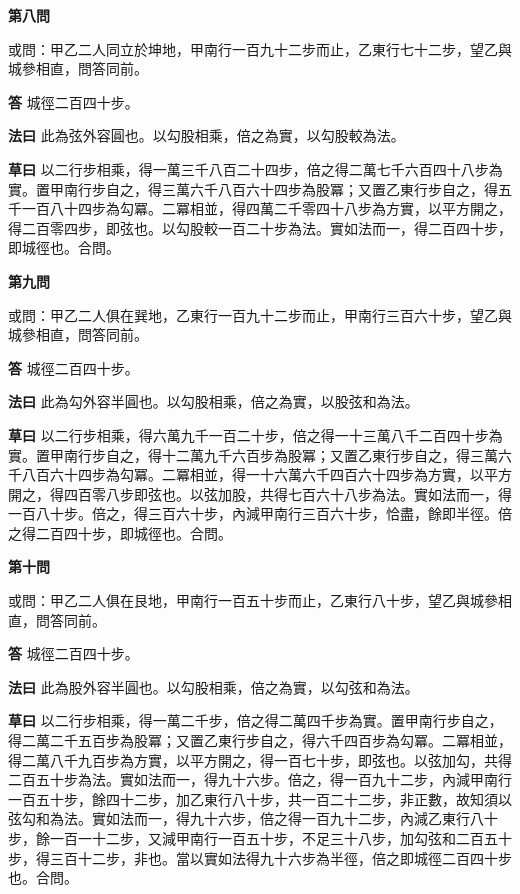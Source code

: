 \documentclass[11pt,a4paper]{article}
\newcommand{\problem}[1]{\par\noindent\textbf{\color{problemcolor}#1}\par\nopagebreak}
\newcommand{\answer}[1]{\par\noindent\textbf{答} #1\par}
\newcommand{\method}[1]{\par\noindent\textbf{法曰} #1\par}
\newcommand{\workings}[1]{\par\noindent\textbf{草曰} #1\par}
\begin{document}
\vspace{0.5cm}

\problem{第八問}

\noindent 或問：甲乙二人同立於坤地，甲南行一百九十二步而止，乙東行七十二步，望乙與城參相直，問答同前。

\answer{城徑二百四十步。}

\method{此為弦外容圓也。以勾股相乘，倍之為實，以勾股較為法。}

\workings{以二行步相乘，得一萬三千八百二十四步，倍之得二萬七千六百四十八步為實。置甲南行步自之，得三萬六千八百六十四步為股冪；又置乙東行步自之，得五千一百八十四步為勾冪。二冪相並，得四萬二千零四十八步為方實，以平方開之，得二百零四步，即弦也。以勾股較一百二十步為法。實如法而一，得二百四十步，即城徑也。合問。}

\vspace{0.5cm}

\problem{第九問}

\noindent 或問：甲乙二人俱在巽地，乙東行一百九十二步而止，甲南行三百六十步，望乙與城參相直，問答同前。

\answer{城徑二百四十步。}

\method{此為勾外容半圓也。以勾股相乘，倍之為實，以股弦和為法。}

\workings{以二行步相乘，得六萬九千一百二十步，倍之得一十三萬八千二百四十步為實。置甲南行步自之，得十二萬九千六百步為股冪；又置乙東行步自之，得三萬六千八百六十四步為勾冪。二冪相並，得一十六萬六千四百六十四步為方實，以平方開之，得四百零八步即弦也。以弦加股，共得七百六十八步為法。實如法而一，得一百八十步。倍之，得三百六十步，內減甲南行三百六十步，恰盡，餘即半徑。倍之得二百四十步，即城徑也。合問。}

\vspace{0.5cm}

\problem{第十問}

\noindent 或問：甲乙二人俱在艮地，甲南行一百五十步而止，乙東行八十步，望乙與城參相直，問答同前。

\answer{城徑二百四十步。}

\method{此為股外容半圓也。以勾股相乘，倍之為實，以勾弦和為法。}

\workings{以二行步相乘，得一萬二千步，倍之得二萬四千步為實。置甲南行步自之，得二萬二千五百步為股冪；又置乙東行步自之，得六千四百步為勾冪。二冪相並，得二萬八千九百步為方實，以平方開之，得一百七十步，即弦也。以弦加勾，共得二百五十步為法。實如法而一，得九十六步。倍之，得一百九十二步，內減甲南行一百五十步，餘四十二步，加乙東行八十步，共一百二十二步，非正數，故知須以弦勾和為法。實如法而一，得九十六步，倍之得一百九十二步，內減乙東行八十步，餘一百一十二步，又減甲南行一百五十步，不足三十八步，加勾弦和二百五十步，得三百十二步，非也。當以實如法得九十六步為半徑，倍之即城徑二百四十步也。合問。}
\end{document}
